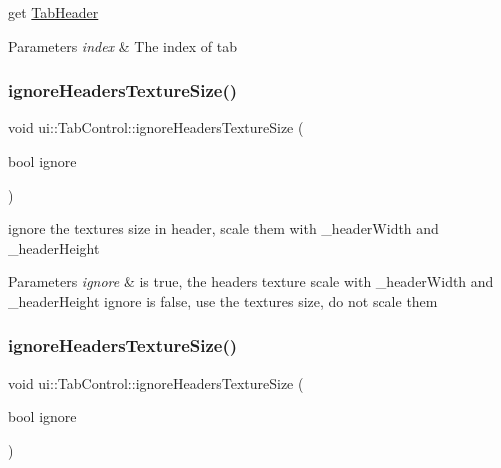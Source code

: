 get \hyperlink{classui_1_1TabHeader}{Tab\+Header} 
\begin{DoxyParams}{Parameters}
{\em index} & The index of tab \\
\hline
\end{DoxyParams}
\mbox{\label{classui_1_1TabControl_a5f4461d3c00405aedb662eaa5354e5ca}} 
\subsubsection{\texorpdfstring{ignore\+Headers\+Texture\+Size()}{ignoreHeadersTextureSize()}\hspace{0.1cm}{\footnotesize\ttfamily [1/2]}}
{\footnotesize\ttfamily void ui\+::\+Tab\+Control\+::ignore\+Headers\+Texture\+Size (\begin{DoxyParamCaption}\item[{bool}]{ignore }\end{DoxyParamCaption})}

ignore the textures\textquotesingle{} size in header, scale them with \+\_\+header\+Width and \+\_\+header\+Height 
\begin{DoxyParams}{Parameters}
{\em ignore} & is {\ttfamily true}, the header\textquotesingle{}s texture scale with \+\_\+header\+Width and \+\_\+header\+Height ignore is {\ttfamily false}, use the texture\textquotesingle{}s size, do not scale them \\
\hline
\end{DoxyParams}
\mbox{\label{classui_1_1TabControl_a5f4461d3c00405aedb662eaa5354e5ca}} 
\subsubsection{\texorpdfstring{ignore\+Headers\+Texture\+Size()}{ignoreHeadersTextureSize()}\hspace{0.1cm}{\footnotesize\ttfamily [2/2]}}
{\footnotesize\ttfamily void ui\+::\+Tab\+Control\+::ignore\+Headers\+Texture\+Size (\begin{DoxyParamCaption}\item[{bool}]{ignore }\end{DoxyParamCaption})}

